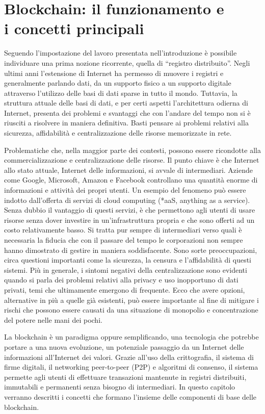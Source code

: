 \chapter{Blockchain: il funzionamento e\\ i concetti principali}
\label{ch:blockchain}

Seguendo l’impostazione del lavoro presentata nell’introduzione è possibile individuare una prima nozione ricorrente, quella di “registro distribuito”. Negli ultimi anni l’estensione di Internet ha permesso di muovere i registri e generalmente parlando dati, da un supporto fisico a un supporto digitale attraverso l’utilizzo delle basi di dati sparse in tutto il mondo. Tuttavia, la struttura attuale delle basi di dati, e per certi aspetti l’architettura odierna di Internet, presenta dei problemi e svantaggi che con l’andare del tempo non si è riusciti a risolvere in maniera definitiva. Basti pensare ai problemi relativi alla sicurezza, affidabilità e centralizzazione delle risorse memorizzate in rete.

Problematiche che, nella maggior parte dei contesti, possono essere ricondotte alla commercializzazione e centralizzazione delle risorse. Il punto chiave è che Internet allo stato attuale, Internet delle informazioni, si avvale di intermediari. Aziende come Google, Microsoft, Amazon e Facebook controllano una quantità enorme di informazioni e attività dei propri utenti. Un esempio del fenomeno può essere indotto dall’offerta di servizi di cloud computing (*aaS, anything as a service). Senza dubbio il vantaggio di questi servizi, è che permettono agli utenti di usare risorse senza dover investire in un’infrastruttura propria e che sono offerti ad un costo relativamente basso. Si tratta pur sempre di intermediari verso quali è necessaria la fiducia che con il passare del tempo le corporazioni non sempre hanno dimostrato di gestire in maniera soddisfacente. Sono sorte preoccupazioni, circa questioni importanti come la sicurezza, la censura e l'affidabilità di questi sistemi. Più in generale, i sintomi negativi della centralizzazione sono evidenti quando si parla dei problemi relativi alla privacy e uso inopportuno di dati privati, temi che ultimamente emergono di frequente. Ecco che avere opzioni, alternative in più a quelle già esistenti, può essere importante al fine di mitigare i rischi che possono essere causati da una situazione di monopolio e concentrazione del potere nelle mani dei pochi.

La blockchain è un paradigma oppure semplificando, una tecnologia che potrebbe portare a una nuova evoluzione, un potenziale passaggio da un Internet delle informazioni all’Internet dei valori. Grazie all’uso della crittografia, il sistema di firme digitali, il networking peer-to-peer (P2P) e algoritmi di consenso, il sistema permette agli utenti di effettuare transazioni mantenute in registri distribuiti, immutabili e permanenti senza bisogno di intermediari. In questo capitolo verranno descritti i concetti che formano l’insieme delle componenti di base delle blockchain.


